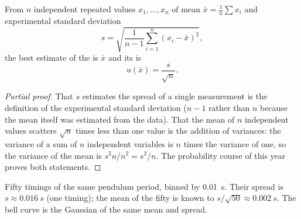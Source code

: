 \begin{proposition}\label{prop:b1:units-dimensions:typeA}
From $n$ independent repeated values $x_1, \dots, x_n$ of mean
$\bar x = \frac1n \sum x_i$ and experimental standard deviation
\[
s = \sqrt{\frac{1}{n-1}\sum_{i=1}^n (x_i - \bar x)^2},
\]
the best estimate of the  is $\bar x$ and its  is
\[
u(\bar x) = \frac{s}{\sqrt n} .
\]
\end{proposition}

\begin{proof}[Partial proof]
That $s$ estimates the spread of a single measurement is the definition
of the experimental standard deviation ($n - 1$ rather than $n$ because
the mean itself was estimated from the data). That the mean of $n$
independent values scatters $\sqrt n$ times less than one value is the
addition of variances: the variance of a sum of $n$ independent
variables is $n$ times the variance of one, so the variance of the
mean is $s^2 n / n^2 = s^2/n$. The probability course of this year
proves both statements.
\end{proof}

\begin{omfigure}

{\small Fifty timings of the same pendulum period, binned by
\qty{0.01}{s}. Their spread is $s \approx \qty{0.016}{s}$ (one timing);
the mean of the fifty is known to $s/\sqrt{50} \approx \qty{0.002}{s}$.
The bell curve is the Gaussian of the same mean and spread.}
\end{omfigure}

